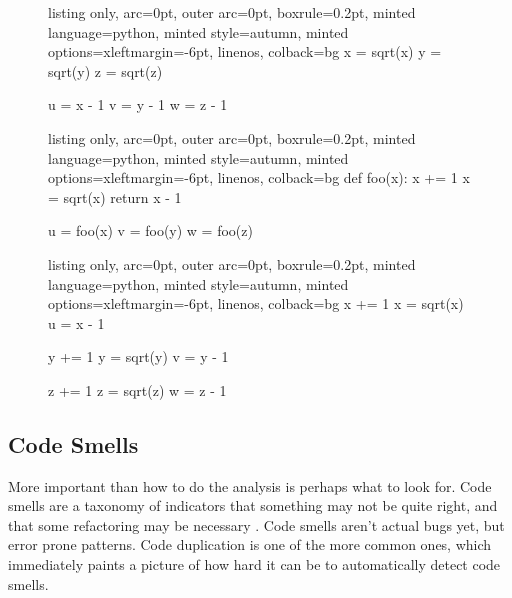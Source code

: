 \documentclass[a4paper, 11pt]{article}
\begin{document}
\begin{multicols*}{2}
\begin{figure*}[t]
\begin{minipage}{0.31\textwidth}
\begin{tcblisting}{listing only, 
  arc=0pt,
  outer arc=0pt, 
  boxrule=0.2pt,
  minted language=python,
  minted style=autumn,
  minted options={xleftmargin=-6pt, linenos},
  colback=bg }
x = sqrt(x)
y = sqrt(y)
z = sqrt(z)

u = x - 1
v = y - 1
w = z - 1
\end{tcblisting}
\vspace{12pt}
\label{smp:duplication}
 \end{minipage}
 \hspace{9pt}
 \begin{minipage}{0.31\textwidth}
  \begin{tcblisting}{listing only, 
  arc=0pt,
  outer arc=0pt, 
  boxrule=0.2pt,
  minted language=python,
  minted style=autumn,
  minted options={xleftmargin=-6pt, linenos},
  colback=bg }
def foo(x):
    x += 1
    x = sqrt(x)
    return x - 1

u = foo(x)
v = foo(y)
w = foo(z)
\end{tcblisting}
\vspace{24pt}
\label{smp:duplication_f}
 \end{minipage}
 \hspace{9pt}
  \begin{minipage}{0.31\textwidth}
  \begin{tcblisting}{listing only, 
  arc=0pt,
  outer arc=0pt, 
  boxrule=0.2pt,
  minted language=python,
  minted style=autumn,
  minted options={xleftmargin=-6pt, linenos},
  colback=bg }
x += 1
x = sqrt(x)
u = x - 1

y += 1
y = sqrt(y)
v = y - 1

z += 1
z = sqrt(z)
w = z - 1
\end{tcblisting}
\label{smp:duplication_2}
 \end{minipage}
\end{figure*}

\subsection{Code Smells}

More important than how to do the analysis is perhaps what to look for. Code smells are a taxonomy of indicators that something may not be quite right, and that some refactoring may be necessary \cite{refactor}. Code smells aren't actual bugs yet, but error prone patterns. Code duplication is one of the more common ones, which immediately paints a picture of how hard it can be to automatically detect code smells. \\


\end{multicols*}
\end{document}

